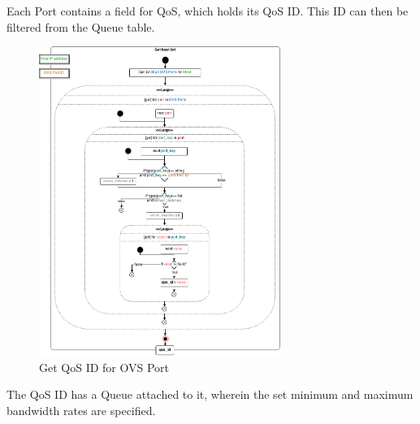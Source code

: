 Each Port contains a field for QoS, which holds its QoS ID. This ID can then be filtered from the Queue table.

\begin{figure}[H]
\centering

\includegraphics[width=0.7\textwidth]{images/implementation/cma_get_qos_id_for_ovs_port}

\caption{Get QoS ID for OVS Port}
\end{figure}

The QoS ID has a Queue attached to it, wherein the set minimum and maximum bandwidth rates are specified.

